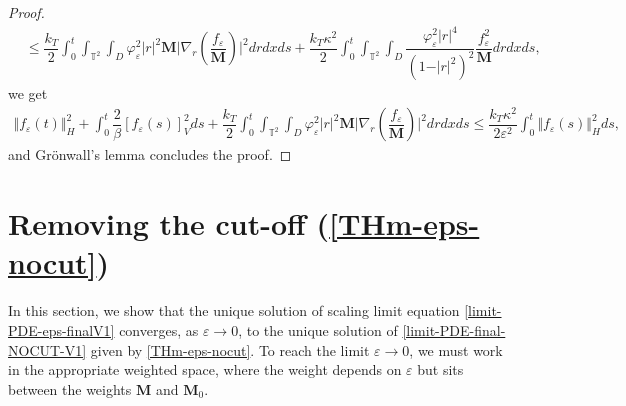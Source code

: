 \documentclass[a4paper,12pt, reqno]{amsart}
\begin{document}
\begin{proof}
\begin{align*}
    &\leq  \dfrac{k_T}{2}\int_0^t\int_{\mathbb{T}^2}\int_D  \varphi_\varepsilon^2\vert r\vert^2\mathbf{M} \vert \nabla_r(\dfrac{f_\varepsilon}{\mathbf{M}})\vert^2 drdxds+ \dfrac{k_T\kappa^2}{2}\int_0^t\int_{\mathbb{T}^2}\int_D   \dfrac{\varphi_\varepsilon^2  \vert r\vert^4}{(1-\vert r\vert^2)^2} \dfrac{f_\varepsilon^2}{\mathbf{M}} drdxds,
\end{align*} we get
\begin{align*}     \Vert f_\varepsilon(t)\Vert_H^2+\int_0^t \dfrac{2}{\beta}[f_\varepsilon(s)]_V^2 ds+ \dfrac{k_T}{2}\int_0^t\int_{\mathbb{T}^2}\int_D  \varphi_\varepsilon^2\vert r\vert^2\mathbf{M} \vert \nabla_r(\dfrac{f_\varepsilon}{\mathbf{M}})\vert^2 drdxds\leq \dfrac{k_T\kappa^2}{2\varepsilon^2}\int_0^t \Vert f_\varepsilon(s)\Vert_H^2ds,
\end{align*}
 and Gr\"onwall’s lemma concludes the proof.
\end{proof}

\section{Removing the cut-off (\autoref{THm-eps-nocut})}\label{section-remove-cut-off}
    In  this    section,   we  show    that    the unique  solution    of   scaling limit equation    \eqref{limit-PDE-eps-finalV1} converges, as $\varepsilon\to 0$,   to  the unique   solution    of \eqref{limit-PDE-final-NOCUT-V1} given by \autoref{THm-eps-nocut}. To reach the limit $\varepsilon\to 0$, we must work in the appropriate weighted space, where the weight depends on $\varepsilon$ but sits  between the weights $\mathbf{M}$ and $\mathbf{M}_0.$
\end{document}
